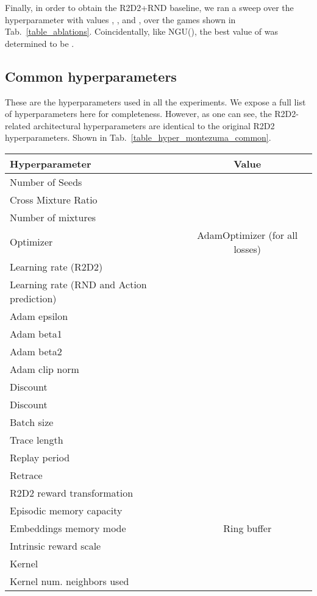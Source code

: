 \documentclass{article} \usepackage{iclr2020_conference,times}
\begin{document}
Finally, in order to obtain the R2D2+RND baseline, we ran a sweep over the  hyperparameter with values , , and , over the  games shown in Tab.~\ref{table_ablations}. Coincidentally, like NGU(), the best value of  was determined to be .

\subsection{Common hyperparameters}
\label{common_hyperparameters}
These are the hyperparameters used in all the experiments. We expose a full list of hyperparameters here for completeness. However, as one can see, the R2D2-related architectural hyperparameters are identical to the original R2D2 hyperparameters. Shown in Tab.~\ref{table_hyper_montezuma_common}.
\begin{small}
\begin{longtable}[h!]{l|c}
\centering
\textbf{Hyperparameter} & \textbf{Value} \\ \hline
Number of Seeds &   \\ \hline
Cross Mixture Ratio &  \\ \hline
Number of mixtures  &  \\ \hline
Optimizer & AdamOptimizer (for all losses) \\ \hline
Learning rate (R2D2) &   \\ \hline
Learning rate (RND and Action prediction) &  \\ \hline
Adam epsilon &   \\ \hline
Adam beta1 &   \\ \hline
Adam beta2 &   \\ \hline
Adam clip norm &   \\ \hline
Discount  &  \\ \hline
Discount  &  \\ \hline
Batch size &  \\ \hline
Trace length &  \\ \hline
Replay period &  \\ \hline
Retrace  &  \\ \hline
R2D2 reward transformation &  \\ \hline
Episodic memory capacity &  \\ \hline
Embeddings memory mode & Ring buffer\\ \hline
Intrinsic reward scale  &  \\ \hline
Kernel  &  \\ \hline
Kernel num. neighbors used &  \\ \hline 

\end{longtable}
\end{small}
\end{document}
